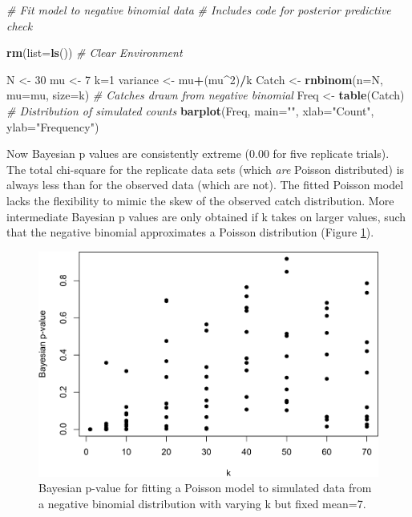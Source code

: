 \documentclass[
]{krantz}
\makeatletter
\newenvironment{Shaded}{\begin{snugshade}}{\end{snugshade}}
\newcommand{\AttributeTok}[1]{\textcolor[rgb]{0.27,0.27,0.27}{#1}}
\newcommand{\CommentTok}[1]{\textcolor[rgb]{0.37,0.37,0.37}{\textit{#1}}}
\newcommand{\DecValTok}[1]{\textcolor[rgb]{0.06,0.06,0.06}{#1}}
\newcommand{\FunctionTok}[1]{\textcolor[rgb]{0.27,0.27,0.27}{\textbf{#1}}}
\newcommand{\NormalTok}[1]{#1}
\newcommand{\OtherTok}[1]{\textcolor[rgb]{0.37,0.37,0.37}{#1}}
\newcommand{\SpecialCharTok}[1]{\textcolor[rgb]{0.43,0.43,0.43}{\textbf{#1}}}
\newcommand{\StringTok}[1]{\textcolor[rgb]{0.5,0.5,0.5}{#1}}
\newenvironment{kframe}{%
\medskip{}
\setlength{\fboxsep}{.8em}
 \def\at@end@of@kframe{}%
 \ifinner\ifhmode%
  \def\at@end@of@kframe{\end{minipage}}%
  \begin{minipage}{\columnwidth}%
 \fi\fi%
 \def\FrameCommand##1{\hskip\@totalleftmargin \hskip-\fboxsep
 \colorbox{shadecolor}{##1}\hskip-\fboxsep
     \hskip-\linewidth \hskip-\@totalleftmargin \hskip\columnwidth}%
 \MakeFramed {\advance\hsize-\width
   \@totalleftmargin\z@ \linewidth\hsize
   \@setminipage}}%
 {\par\unskip\endMakeFramed%
 \at@end@of@kframe}
\renewenvironment{Shaded}{\begin{kframe}}{\end{kframe}}
\makeatother
\begin{document}
\begin{Shaded}
\begin{Highlighting}[]
\CommentTok{\# Fit model to negative binomial data}
\CommentTok{\# Includes code for posterior predictive check}

\FunctionTok{rm}\NormalTok{(}\AttributeTok{list=}\FunctionTok{ls}\NormalTok{()) }\CommentTok{\# Clear Environment}

\NormalTok{N }\OtherTok{\textless{}{-}} \DecValTok{30}
\NormalTok{mu }\OtherTok{\textless{}{-}} \DecValTok{7}
\NormalTok{k}\OtherTok{=}\DecValTok{1}
\NormalTok{variance }\OtherTok{\textless{}{-}}\NormalTok{ mu}\SpecialCharTok{+}\NormalTok{(mu}\SpecialCharTok{\^{}}\DecValTok{2}\NormalTok{)}\SpecialCharTok{/}\NormalTok{k}
\NormalTok{Catch }\OtherTok{\textless{}{-}} \FunctionTok{rnbinom}\NormalTok{(}\AttributeTok{n=}\NormalTok{N, }\AttributeTok{mu=}\NormalTok{mu, }\AttributeTok{size=}\NormalTok{k) }\CommentTok{\# Catches drawn from negative binomial}
\NormalTok{Freq }\OtherTok{\textless{}{-}} \FunctionTok{table}\NormalTok{(Catch)  }\CommentTok{\# Distribution of simulated counts}
\FunctionTok{barplot}\NormalTok{(Freq, }\AttributeTok{main=}\StringTok{""}\NormalTok{, }\AttributeTok{xlab=}\StringTok{"Count"}\NormalTok{, }\AttributeTok{ylab=}\StringTok{"Frequency"}\NormalTok{)}
\end{Highlighting}
\end{Shaded}

Now Bayesian p values are consistently extreme (0.00 for five replicate trials). The total chi-square for the replicate data sets (which \emph{are} Poisson distributed) is always less than for the observed data (which are not). The fitted Poisson model lacks the flexibility to mimic the skew of the observed catch distribution. More intermediate Bayesian p values are only obtained if k takes on larger values, such that the negative binomial approximates a Poisson distribution (Figure \ref{fig:PPC}).

\begin{figure}
\includegraphics[width=0.9\linewidth]{bookdown_files/figure-latex/PPC-1} \caption{Bayesian p-value for fitting a Poisson model to simulated data from a negative binomial distribution with varying k but fixed mean=7.}\label{fig:PPC}
\end{figure}
\end{document}
